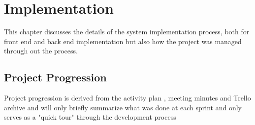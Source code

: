 
\chapter{Implementation}

This chapter discusses the details of the system implementation process, both for front end and back end implementation but also how the project was managed through out the process.


\section{Project Progression}
Project progression is derived from the activity plan , meeting minutes  and Trello archive   and will only briefly summarize what was done at each sprint and only serves as a "quick tour" through the development process  

